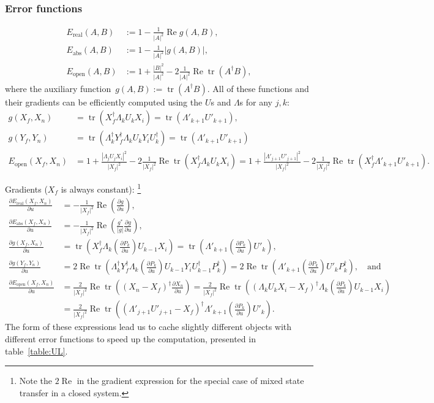 \documentclass[aps, pra, a4paper, longbibliography]{revtex4}
\DeclareMathOperator{\tr}{tr}
\DeclareMathOperator{\re}{Re}
\newcommand{\dd}[2]{\frac{\partial #1}{\partial #2}}
\begin{document}
\subsubsection{Error functions}

\begin{align}
E_\text{real}(A, B) &:= 1 -\frac{1}{|A|^2} \re g(A, B),\\
E_\text{abs}(A, B) &:= 1 -\frac{1}{|A|^2} |g(A, B)|,\\
E_\text{open}(A, B) &:= 1 +\frac{|B|^2}{|A|^2} -2 \frac{1}{|A|^2} \re \tr(A^\dagger B),
\end{align}
where the auxiliary function~$g(A, B) := \tr(A^\dagger B)$.
All of these functions and their gradients can be efficiently computed
using the $U$s and $\Lambda$s
for any $j, k$:
\begin{align}
g(X_f, X_n) &= \tr(X_f^\dagger \Lambda_k U_k X_i)
= \tr(\Lambda'_{k+1} U'_{k+1}),\\
g(Y_f, Y_n) &= \tr(\Lambda_k^\dagger Y_f^\dagger \Lambda_k U_k Y_i U_k^\dagger)
= \tr(\Lambda'_{k+1} U'_{k+1})\\
E_\text{open}(X_f, X_n) &= 1 +\frac{|\Lambda_j U_j X_i|^2}{|X_f|^2} -2 \frac{1}{|X_f|^2} \re \tr(X_f^\dagger \Lambda_k U_k X_i)
= 1 +\frac{|\Lambda'_{j+1} U'_{j+1}|^2}{|X_f|^2} -2 \frac{1}{|X_f|^2} \re \tr(X_f^\dagger \Lambda'_{k+1} U'_{k+1}).
\end{align}


Gradients ($X_f$ is always constant):
\footnote{Note the $2 \re$ in the gradient expression  
for the special case of mixed state transfer in a closed system.}
\begin{align}
\dd{E_\text{real}(X_f,X_n)}{u}
&= -\frac{1}{|X_f|^2} \re \left( \dd{g}{u} \right),\\
\dd{E_\text{abs}(X_f,X_n)}{u}
&= -\frac{1}{|X_f|^2} \re \left(\frac{g^*}{|g|} \dd{g}{u} \right),\\
\dd{g(X_f, X_n)}{u} &= \tr(X_f^\dagger \Lambda_{k} \left(\dd{P_k}{u}\right) U_{k-1} X_i)
= \tr(\Lambda'_{k+1} \left(\dd{P_k}{u}\right) U'_{k}),\\
\dd{g(Y_f, Y_n)}{u} &= 2 \re \tr\left(\Lambda_k^\dagger Y_f^\dagger \Lambda_k \left(\dd{P_k}{u}\right) U_{k-1} Y_i U_{k-1}^\dagger P_k^\dagger \right)
= 2 \re \tr\left(\Lambda'_{k+1} \left(\dd{P_k}{u}\right) U'_{k} P_k^\dagger \right), \quad \text{and}\\
\dd{E_\text{open}(X_f, X_n)}{u}
&= \frac{2}{|X_f|^2} \re \tr\left((X_n-X_f)^\dagger \dd{X_n}{u}\right)
= \frac{2}{|X_f|^2} \re \tr\left((\Lambda_k U_k X_i -X_f)^\dagger  \Lambda_{k} \left(\dd{P_k}{u}\right) U_{k-1} X_i \right)\\
&= \frac{2}{|X_f|^2} \re \tr\left((\Lambda'_{j+1} U'_{j+1} -X_f)^\dagger  \Lambda'_{k+1} \left(\dd{P_k}{u}\right) U'_{k} \right).
\end{align}
The form of these expressions lead us to cache slightly different objects with
different error functions to speed up the computation, presented in table~\ref{table:UL}.
\end{document}
